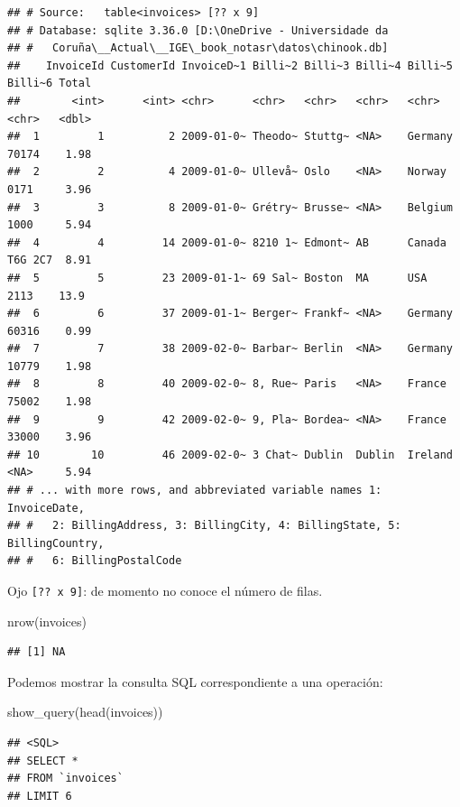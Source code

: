 \documentclass[
]{book}
\newenvironment{Shaded}{\begin{snugshade}}{\end{snugshade}}
\newcommand{\FunctionTok}[1]{\textcolor[rgb]{0.00,0.00,0.00}{#1}}
\newcommand{\NormalTok}[1]{#1}
\theoremstyle{break}
\theoremstyle{nonumberplain}
\begin{document}
\begin{verbatim}
## # Source:   table<invoices> [?? x 9]
## # Database: sqlite 3.36.0 [D:\OneDrive - Universidade da
## #   Coruña\__Actual\__IGE\_book_notasr\datos\chinook.db]
##    InvoiceId CustomerId InvoiceD~1 Billi~2 Billi~3 Billi~4 Billi~5 Billi~6 Total
##        <int>      <int> <chr>      <chr>   <chr>   <chr>   <chr>   <chr>   <dbl>
##  1         1          2 2009-01-0~ Theodo~ Stuttg~ <NA>    Germany 70174    1.98
##  2         2          4 2009-01-0~ Ullevå~ Oslo    <NA>    Norway  0171     3.96
##  3         3          8 2009-01-0~ Grétry~ Brusse~ <NA>    Belgium 1000     5.94
##  4         4         14 2009-01-0~ 8210 1~ Edmont~ AB      Canada  T6G 2C7  8.91
##  5         5         23 2009-01-1~ 69 Sal~ Boston  MA      USA     2113    13.9 
##  6         6         37 2009-01-1~ Berger~ Frankf~ <NA>    Germany 60316    0.99
##  7         7         38 2009-02-0~ Barbar~ Berlin  <NA>    Germany 10779    1.98
##  8         8         40 2009-02-0~ 8, Rue~ Paris   <NA>    France  75002    1.98
##  9         9         42 2009-02-0~ 9, Pla~ Bordea~ <NA>    France  33000    3.96
## 10        10         46 2009-02-0~ 3 Chat~ Dublin  Dublin  Ireland <NA>     5.94
## # ... with more rows, and abbreviated variable names 1: InvoiceDate,
## #   2: BillingAddress, 3: BillingCity, 4: BillingState, 5: BillingCountry,
## #   6: BillingPostalCode
\end{verbatim}

Ojo \texttt{{[}??\ x\ 9{]}}: de momento no conoce el número de filas.

\begin{Shaded}
\begin{Highlighting}[]
\FunctionTok{nrow}\NormalTok{(invoices)}
\end{Highlighting}
\end{Shaded}

\begin{verbatim}
## [1] NA
\end{verbatim}

Podemos mostrar la consulta SQL correspondiente a una operación:

\begin{Shaded}
\begin{Highlighting}[]
\FunctionTok{show\_query}\NormalTok{(}\FunctionTok{head}\NormalTok{(invoices))}
\end{Highlighting}
\end{Shaded}

\begin{verbatim}
## <SQL>
## SELECT *
## FROM `invoices`
## LIMIT 6
\end{verbatim}
\end{document}
